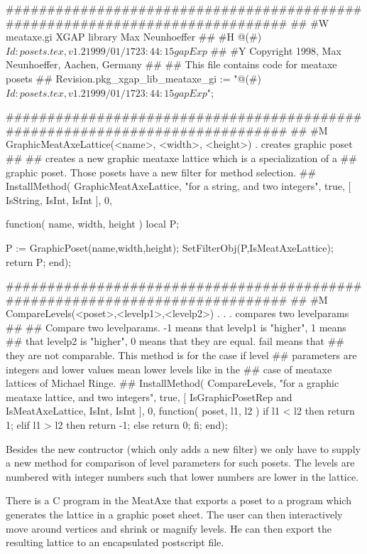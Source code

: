 \beginexample
#############################################################################
##
#W  meataxe.gi                  XGAP library                  Max Neunhoeffer
##
#H  @(#)$Id: posets.tex,v 1.2 1999/01/17 23:44:15 gap Exp $
##
#Y  Copyright 1998,       Max Neunhoeffer,              Aachen,       Germany
##
##  This file contains code for meataxe posets
##
Revision.pkg_xgap_lib_meataxe_gi :=
    "@(#)$Id: posets.tex,v 1.2 1999/01/17 23:44:15 gap Exp $";

#############################################################################
##
#M  GraphicMeatAxeLattice(<name>, <width>, <height>)  . creates graphic poset
##
##  creates a new graphic meataxe lattice which is a specialization of a
##  graphic poset. Those posets have a new filter for method selection.
##
InstallMethod( GraphicMeatAxeLattice,
    "for a string, and two integers",
    true,
    [ IsString,
      IsInt,
      IsInt ],
    0,

function( name, width, height )
  local P;

  P := GraphicPoset(name,width,height);
  SetFilterObj(P,IsMeatAxeLattice);
  return P;
end);

#############################################################################
##
#M  CompareLevels(<poset>,<levelp1>,<levelp2>) . . . compares two levelparams
##
##  Compare two levelparams. -1 means that levelp1 is "higher", 1 means
##  that levelp2 is "higher", 0 means that they are equal. fail means that
##  they are not comparable. This method is for the case if level
##  parameters are integers and lower values mean lower levels like in the
##  case of meataxe lattices of Michael Ringe.
##
InstallMethod( CompareLevels,
    "for a graphic meataxe lattice, and two integers",
    true,
    [ IsGraphicPosetRep and IsMeatAxeLattice, IsInt, IsInt ],
    0,
function( poset, l1, l2 )
  if l1 < l2 then
    return 1;
  elif l1 > l2 then
    return -1;
  else
    return 0;
  fi;
end);
\endexample

Besides the new contructor (which only adds a new filter) we only have to
supply a new method for comparison of level parameters for such posets. The 
levels are numbered with integer numbers such that lower numbers are lower
in the lattice.

There is a C program in the MeatAxe that exports a poset to a {\GAP}
program which generates the lattice in a graphic poset sheet. The user can
then interactively move around vertices and shrink or magnify levels. He
can then export the resulting lattice to an encapsulated postscript file.

